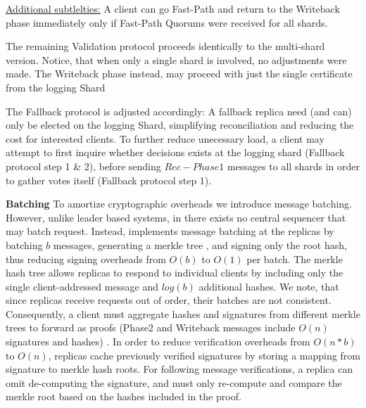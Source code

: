 \underline{Additional subtlelties:} A client can go Fast-Path and return to the Writeback phase immediately only if Fast-Path Quorums were received for all shards. 

The remaining Validation protocol proceeds identically to the multi-shard version. Notice, that when only a single shard is involved, no adjustments were made. The Writeback phase instead, may proceed with just the single certificate from the logging Shard


The Fallback protocol is adjusted accordingly: A fallback replica need (and can) only be elected on the logging Shard, simplifying reconciliation and reducing the cost for interested clients. 
To further reduce unecessary load, a client may attempt to first inquire whether decisions exists at the logging shard (Fallback protocol step 1 \& 2), before sending $Rec-Phase1$ messages to all shards in order to gather votes itself (Fallback protocol step 1). 

\par \textbf{Batching}
To amortize cryptographic overheads we introduce message batching. However, unlike leader based systems, in \sys there exists no central sequencer that may batch request. Instead, \sys implements message batching at the replicas by batching $b$ messages, generating a merkle tree \cite{merkle1987digital}, and signing only the root hash, thus reducing signing overheads from $O(b)$ to $O(1)$ per batch. The merkle hash tree allows replicas to respond to individual clients by including only the single client-addressed message and $log(b)$ additional hashes. We note, that since replicas receive requests out of order, their batches are not consistent. Consequently, a client must aggregate hashes and signatures from different merkle trees to forward as proofs (Phase2 and Writeback messages include $O(n)$ signatures and hashes) .
In order to reduce verification overheads from $O(n*b)$ to $O(n)$, replicas cache previously verified signatures by storing a mapping from signature to merkle hash roots. For following message verifications, a replica can omit de-computing the signature, and must only re-compute and compare the merkle root based on the hashes included in the proof.

